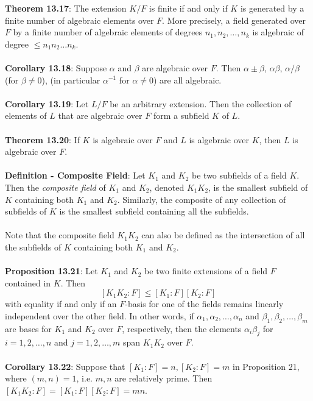\documentclass{article}
\begin{document}
\textbf{Theorem 13.17}: The extension $K / F$ is finite if and only if $K$ is generated by a finite number of algebraic elements over $F$. More precisely, a field generated over $F$ by a finite number of algebraic elements of degrees $n_1, n_2, \dots, n_k$ is algebraic of degree $\leq n_1 n_2 \dots n_k$. \\ \\
\textbf{Corollary 13.18}: Suppose $\alpha$ and $\beta$ are algebraic over $F$. Then $\alpha \pm \beta$, $\alpha \beta$, $\alpha / \beta$ (for $\beta \neq 0$), (in particular $\alpha^{-1}$ for $\alpha \neq 0$) are all algebraic. \\ \\
\textbf{Corollary 13.19}: Let $L/ F$ be an arbitrary extension. Then the collection of elements of $L$ that are algebraic over $F$ form a subfield $K$ of $L$. \\ \\
\textbf{Theorem 13.20}: If $K$ is algebraic over $F$ and $L$ is algebraic over $K$, then $L$ is algebraic over $F$. \\ \\
\textbf{Definition - Composite Field}: Let $K_1$ and $K_2$ be two subfields of a field $K$. Then the \textit{composite field} of $K_1$ and $K_2$, denoted $K_1 K_2$, is the smallest subfield of $K$ containing both $K_1$ and $K_2$. Similarly, the composite of any collection of subfields of $K$ is the smallest subfield containing all the subfields. \\ \\
Note that the composite field $K_1K_2$ can also be defined as the intersection of all the subfields of $K$ containing both $K_1$ and $K_2$. \\ \\
\textbf{Proposition 13.21}: Let $K_1$ and $K_2$ be two finite extensions of a field $F$ contained in $K$. Then $$[K_1 K_2 : F] \leq [K_1 : F][K_2 : F]$$ with equality if and only if an $F$-basis for one of the fields remains linearly independent over the other field. In other words, if $\alpha_1, \alpha_2, \dots, \alpha_n$ and $\beta_1, \beta_2, \dots, \beta_m$ are bases for $K_1$ and $K_2$ over $F$, respectively, then the elements $\alpha_i \beta_j$ for $i = 1, 2, \dots, n$ and $j = 1, 2, \dots, m$ span $K_1 K_2$ over $F$. \\ \\
\textbf{Corollary 13.22}: Suppose that $[K_1 : F] = n, [K_2 : F] = m$ in Proposition 21, where $(m, n) = 1$, i.e. $m, n$ are relatively prime. Then $[K_1 K_2 : F] = [K_1 : F][K_2 : F] = mn$. \\ \\
\end{document}
